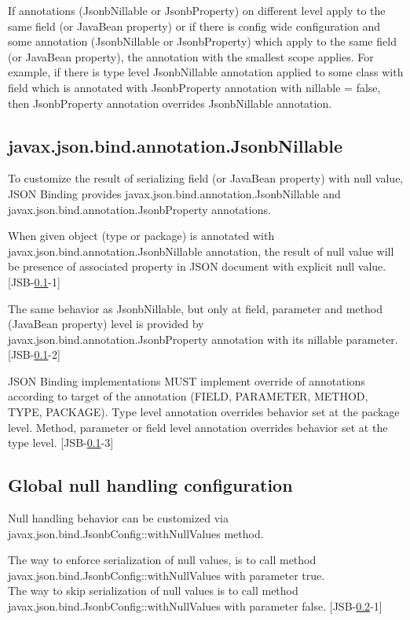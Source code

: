 If annotations (JsonbNillable or JsonbProperty) on different level apply to the same field (or JavaBean property) or if there is config wide configuration and some annotation (JsonbNillable or JsonbProperty) which apply to the same field (or JavaBean property), the annotation with the smallest scope applies. For example, if there is type level JsonbNillable annotation applied to some class with field which is annotated with JsonbProperty annotation with nillable = false, then JsonbProperty annotation overrides JsonbNillable annotation.

\subsection{javax.json.bind.annotation.JsonbNillable}
\label{subsec:JsonbNillable}

To customize the result of serializing field (or JavaBean property) with null value, JSON Binding provides javax.json.bind.annotation.JsonbNillable and javax.json.bind.annotation.JsonbProperty annotations.

When given object (type or package) is annotated with javax.json.bind.annotation.JsonbNillable annotation, the result of null value will be presence of associated property in JSON document with explicit null value. [JSB-\ref{subsec:JsonbNillable}-1]

The same behavior as JsonbNillable, but only at field, parameter and method (JavaBean property) level is provided by javax.json.bind.annotation.JsonbProperty annotation with its nillable parameter. [JSB-\ref{subsec:JsonbNillable}-2]

JSON Binding implementations MUST implement override of annotations according to target of the annotation (FIELD, PARAMETER, METHOD, TYPE, PACKAGE). Type level annotation overrides behavior set at the package level. Method, parameter or field level annotation overrides behavior set at the type level. [JSB-\ref{subsec:JsonbNillable}-3]

\subsection{Global null handling configuration}
\label{subsec:NullSerializationPolicy}

Null handling behavior can be customized via javax.json.bind.JsonbConfig::withNullValues method.

The way to enforce serialization of null values, is to call method javax.json.bind.JsonbConfig::withNullValues with parameter true. \\
The way to skip serialization of null values is to call method javax.json.bind.JsonbConfig::withNullValues with parameter false. [JSB-\ref{subsec:NullSerializationPolicy}-1]

